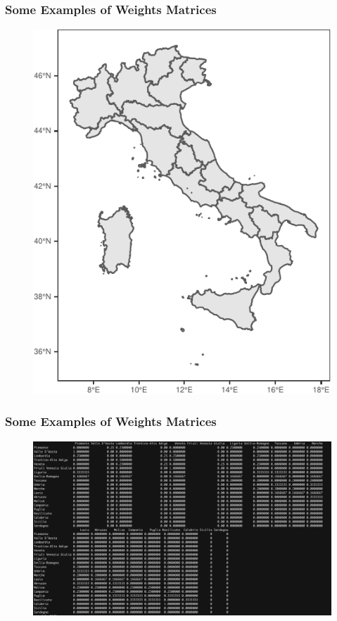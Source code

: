 \documentclass[
  shownotes,
  xcolor={svgnames},
  hyperref={colorlinks,citecolor=DarkBlue,linkcolor=DarkRed,urlcolor=DarkBlue}
   , aspectratio=169]{beamer}
\begin{document}
\begin{frame}[fragile]
\frametitle{Some Examples of Weights Matrices}


  \begin{figure}[H] \centering
    \captionsetup{justification=centering}
    \includegraphics[scale=0.6]{figures/italia.pdf}
   \end{figure}

\end{frame}

\begin{frame}[fragile]
\frametitle{Some Examples of Weights Matrices}


  \begin{figure}[H] \centering
    \captionsetup{justification=centering}
    \includegraphics[scale=0.3]{figures/mat_italia}
   \end{figure}


\end{frame}
\end{document}
